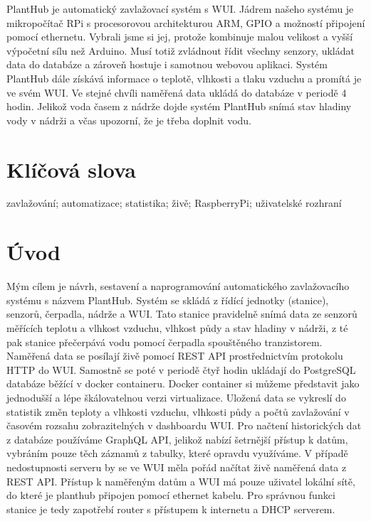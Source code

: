 \documentclass[12pt,a4paper]{article}
\begin{document}
PlantHub je automatický zavlažovací systém s \ac{WUI}.
Jádrem našeho systému je mikropočítač \ac{RPi} s procesorovou architekturou
\ac{ARM},
\ac{GPIO} a možností připojení pomocí ethernetu.
Vybrali jsme si jej, protože kombinuje malou velikost a vyšší výpočetní sílu
než Arduino. Musí totiž zvládnout řídit všechny senzory, ukládat data do
databáze a zároveň hostuje i samotnou webovou aplikaci. Systém PlantHub dále
získává informace o teplotě, vlhkosti a tlaku vzduchu a promítá je ve svém
\ac{WUI}. Ve stejné chvíli naměřená data ukládá do databáze v periodě 4
hodin. Jelikož voda časem z nádrže dojde systém PlantHub snímá stav hladiny
vody v nádrži a včas upozorní, že je třeba doplnit vodu.

\section*{Klíčová slova}

zavlažování; automatizace; statistika; živě; RaspberryPi; uživatelské rozhraní

\clearpage

\tableofcontents

\clearpage

\section{Úvod}

Mým cílem je návrh, sestavení a naprogramování automatického zavlažovacího
systému s názvem PlantHub. Systém se skládá z řídící jednotky (stanice),
senzorů, čerpadla, nádrže a \ac{WUI}. Tato stanice pravidelně snímá data ze
senzorů
měřících
teplotu a vlhkost vzduchu, vlhkost půdy a stav hladiny v nádrži, z té pak
stanice přečerpává vodu pomocí čerpadla spouštěného tranzistorem. Naměřená
data
se posílají živě pomocí \ac{REST} \ac{API} prostřednictvím
protokolu HTTP do \ac{WUI}. Samostně se poté v periodě čtyř hodin ukládají do
PostgreSQL databáze běžící v docker
containeru. Docker container si můžeme představit jako jednodušší a lépe
škálovatelnou verzi
virtualizace. Uložená data se vykreslí do
statistik
změn teploty a vlhkosti vzduchu, vlhkosti půdy a počtů zavlažování v časovém
rozsahu zobrazitelných v dashboardu \ac{WUI}. Pro načtení historických dat z
databáze
používáme \ac{GraphQL} \ac{API}, jelikož nabízí šetrnější přístup k datům,
vybráním pouze
těch záznamů z tabulky, které opravdu využíváme. V případě nedostupnosti
serveru by se ve \ac{WUI} měla pořád načítat živě naměřená data z \ac{REST}
\ac{API}. Přístup
k naměřeným datům a
\ac{WUI} má pouze
uživatel lokální
sítě, do které je planthub připojen pomocí ethernet kabelu. Pro správnou funkci
stanice je tedy zapotřebí router s přístupem k internetu a DHCP serverem.
\end{document}
